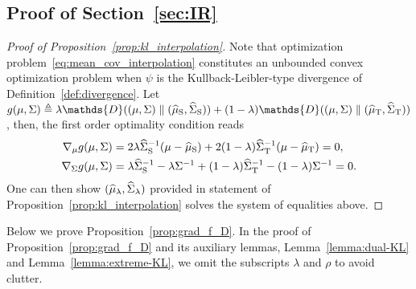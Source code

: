 \documentclass{article}
\begin{document}
\subsection{Proof of Section~\ref{sec:IR}}
\begin{proof}[Proof of Proposition~\ref{prop:kl_interpolation}]
Note that optimization problem~\eqref{eq:mean_cov_interpolation} constitutes an unbounded convex optimization problem when $\psi$ is the Kullback-Leibler-type divergence of Definition~\ref{def:divergence}.
Let $g(\mu, \Sigma) \Let \lambda \mathds{D}((\mu, \Sigma) \parallel (\msa_{\rm S}, \covsa_{\rm S})) + (1-\lambda) \mathds{D}((\mu, \Sigma) \parallel (\msa_{\rm T}, \covsa_{\rm T}))$,
then, the first order optimality condition reads
\begin{align*}
\nabla_{\mu}g(\mu, \Sigma) &= 2\lambda\widehat{\Sigma}^{-1}_{\rm S} (\mu-\widehat {\mu}_{\rm S}) + 2(1-\lambda)\widehat{\Sigma}^{-1}_{\rm T} (\mu-\widehat {\mu}_{\rm T}) = 0,\\
\nabla_{\Sigma}g(\mu, \Sigma) &= \lambda \widehat{\Sigma}^{-1}_{\rm S} - \lambda \Sigma^{-1} + (1-\lambda) \widehat{\Sigma}^{-1}_{\rm T} -( 1 - \lambda) \Sigma^{-1} = 0.
\end{align*}
One can then show $(\widehat {\mu}_\lambda, \widehat{\Sigma}_\lambda)$ provided in statement of Proposition~\ref{prop:kl_interpolation} solves the system of equalities above.
\end{proof}

Below we prove Proposition~\ref{prop:grad_f_D}. In the proof of Proposition~\ref{prop:grad_f_D} and its auxiliary lemmas, Lemma~\ref{lemma:dual-KL} and Lemma~\ref{lemma:extreme-KL}, we omit the subscripts $\lambda$ and $\rho$ to avoid clutter.


\end{document}
